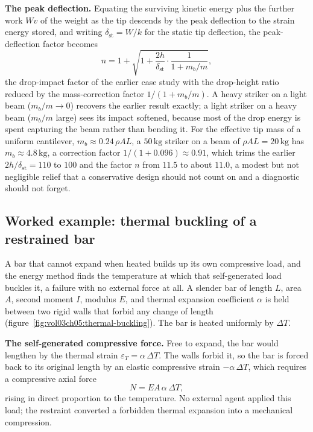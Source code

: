 \textbf{The peak deflection.} Equating the surviving kinetic energy plus the
further work $Wv$ of the weight as the tip descends by the peak deflection to
the strain energy stored, and writing $\delta_\text{st} = W/k$ for the static
tip deflection, the peak-deflection factor becomes
\[
n = 1 + \sqrt{1 + \frac{2h}{\delta_\text{st}}\cdot\frac{1}{1 + m_b/m}},
\]
the drop-impact factor of the earlier case study with the drop-height ratio
reduced by the mass-correction factor $1/(1 + m_b/m)$. A heavy striker on a
light beam ($m_b/m\to 0$) recovers the earlier result exactly; a light striker
on a heavy beam ($m_b/m$ large) sees its impact softened, because most of the
drop energy is spent capturing the beam rather than bending it. For the effective
tip mass of a uniform cantilever, $m_b \approx 0.24\,\rho A L$, a $50\,\si
{\kilogram}$ striker on a beam of $\rho A L = 20\,\si{\kilogram}$ has
$m_b\approx 4.8\,\si{\kilogram}$, a correction factor $1/(1 + 0.096) \approx
0.91$, which trims the earlier $2h/\delta_\text{st} = 110$ to $100$ and the
factor $n$ from $11.5$ to about $11.0$, a modest but not negligible relief that
a conservative design should not count on and a diagnostic should not forget.

\subsection{Worked example: thermal buckling of a restrained bar}

A bar that cannot expand when heated builds up its own compressive load, and
the energy method finds the temperature at which that self-generated load
buckles it, a failure with no external force at all. A slender bar of length
$L$, area $A$, second moment $I$, modulus $E$, and thermal expansion
coefficient $\alpha$ is held between two rigid walls that forbid any change of
length (figure~\ref{fig:vol03ch05:thermal-buckling}). The bar is heated
uniformly by $\Delta T$.



\textbf{The self-generated compressive force.} Free to expand, the bar would
lengthen by the thermal strain $\varepsilon_T = \alpha\,\Delta T$. The walls
forbid it, so the bar is forced back to its original length by an elastic
compressive strain $-\alpha\,\Delta T$, which requires a compressive axial
force
\[
N = EA\,\alpha\,\Delta T,
\]
rising in direct proportion to the temperature. No external agent applied this
load; the restraint converted a forbidden thermal expansion into a mechanical
compression.

